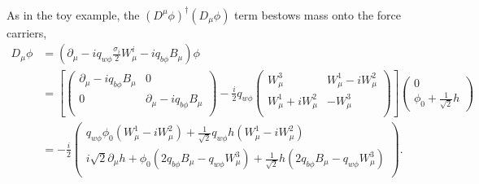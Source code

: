 As in the toy example, the $(D^\mu\phi)^\dagger(D_\mu\phi)$ term bestows mass onto the force carriers,
\begin{equation}
\begin{split}
D_\mu\phi &= (\partial_\mu - iq_{w\phi}\frac{\sigma_i}{2}W^i_\mu - iq_{b\phi}B_\mu)\phi \\
          &= \left[ 
\begin{pmatrix}
\partial_\mu - iq_{b\phi}B_\mu & 0 \\
0 & \partial_\mu - iq_{b\phi}B_\mu \\
\end{pmatrix} 
 - \frac{i}{2}q_{w\phi}
\begin{pmatrix}
W^3_\mu & W^1_\mu - iW^2_\mu \\
W^1_\mu + iW^2_\mu & -W^3_\mu \\
\end{pmatrix} \right] \begin{pmatrix} 0 \\ \phi_0 + \frac{1}{\sqrt{2}}h \end{pmatrix} \\
         &= -\frac{i}{2}
\begin{pmatrix}
q_{w\phi}\phi_0(W^1_\mu - iW^2_\mu) + \frac{1}{\sqrt{2}}q_{w\phi}h(W^1_\mu - iW^2_\mu)\\
i\sqrt{2}\partial_\mu h + \phi_0(2q_{b\phi}B_\mu - q_{w\phi}W^3_\mu) + \frac{1}{\sqrt{2}}h(2q_{b\phi}B_\mu - q_{w\phi}W^3_\mu)\\
\end{pmatrix}.
\end{split}
\end{equation}
